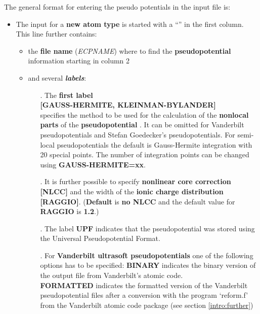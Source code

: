 \documentclass[twoside,10pt,titlepage,a4paper]{article}
\begin{document}
  The general format for entering the pseudo potentials in the input file is:
\begin{itemize}
\item The input for a {\bf new atom type} is started
      with a ``{\bf *}'' in the first column. This line further contains:
      \begin{itemize}
      \item the {\bf file name} ({\sl ECPNAME}) where to find the
            {\bf pseudopotential}
            information starting in column 2
      \item and several {\bf \sl labels}:
            \begin{itemize} %
            \item[.] The {\bf first label} \\
            {\bf [GAUSS-HERMITE, KLEINMAN-BYLANDER]}\\
                  specifies the method to be used for the calculation of
                  the {\bf nonlocal parts} of the {\bf pseudopotential} \cite{KB}.
                  It can be omitted for Vanderbilt pseudopotentials
                  and Stefan Goedecker's pseudopotentials. For semi-local
                  pseudopotentials the default is Gauss-Hermite integration
                  with 20 special points. The number of integration points
                  can be changed using {\bf GAUSS-HERMITE=xx}.
            \item[.] It is further possible to specify {\bf nonlinear core
                  correction \cite{NLCC} [NLCC]} and the width of the 
                  {\bf ionic charge distribution [RAGGIO]}.
                  ({\bf Default} is {\bf no NLCC} and the default value for
                  {\bf RAGGIO} is {\bf 1.2}.)
            \item[.] The  label {\bf UPF} indicates that the pseudopotential
                  was stored using the Universal Pseudopotential Format.
            \item[.] For {\bf Vanderbilt ultrasoft pseudopotentials}
                one of the following options has to be specified:
                {\bf BINARY} indicates the binary version of the output
                file from Vanderbilt's atomic code. \\
                {\bf FORMATTED} indicates the formatted version of the
                Vanderbilt pseudopotential files after a conversion with
                the program `reform.f' from the
                Vanderbilt atomic code package (see section \ref{intro:further}) \\

\end{itemize}
\end{itemize}
\end{itemize}
\end{document}
